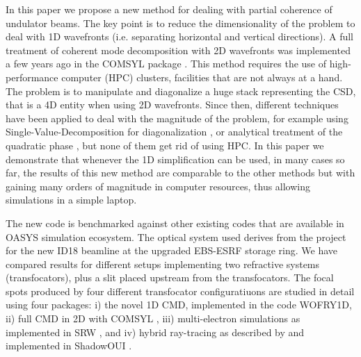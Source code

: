 \documentclass{iucr}              %
\begin{document}
In this paper we propose a new method for dealing with partial coherence of undulator beams. The key point is to reduce the dimensionality of the problem to deal with 1D wavefronts (i.e. separating horizontal and vertical directions). A full treatment of coherent mode decomposition with 2D wavefronts was implemented a few years ago in the COMSYL package \cite{glass2017}. This method requires the use of high-performance computer (HPC) clusters, facilities that are not always at a hand. The problem is to manipulate and diagonalize a huge stack representing the CSD, that is a 4D entity when using 2D wavefronts. Since then, different techniques have been applied to deal with the magnitude of the problem, for example using Single-Value-Decomposition for diagonalization \cite{SVDHanXu}, or analytical treatment of the quadratic phase \cite{ChubarCMD2022}, but none of them get rid of using HPC. In this paper we demonstrate that whenever the 1D simplification can be used, in many cases so far, the results of this new method are comparable to the other methods but with gaining many orders of magnitude in computer resources, thus allowing simulations in a simple laptop. 

The new code is benchmarked against other existing codes that are available in OASYS \cite{codeOASYS}  simulation ecosystem. The optical system used derives from the project for the new ID18 beamline at the upgraded EBS-ESRF storage ring. We have compared results for different setups implementing two refractive systems (transfocators), plus a slit placed upstream from the transfocators. The focal spots produced by four different transfocator configuratiuons are studied in detail using four packages: i) the novel 1D CMD, implemented in the code WOFRY1D, ii) full CMD in 2D with COMSYL \cite{codeCOMSYL}, iii) multi-electron simulations as implemented in SRW \cite{codeSRW}, and iv) hybrid ray-tracing as described by  and implemented in ShadowOUI \cite{codeSHADOWOUI}.



\end{document}
